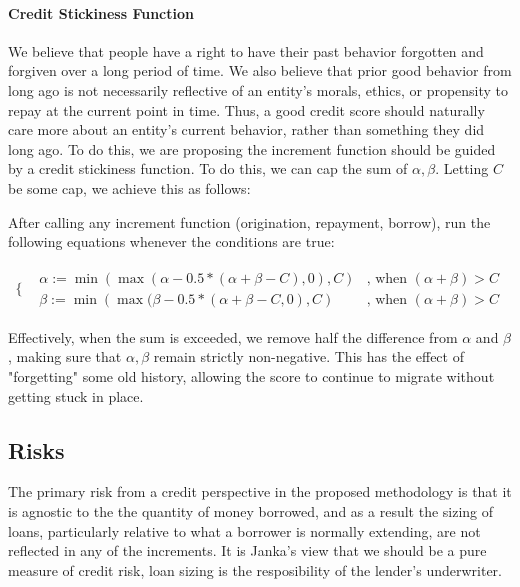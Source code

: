 \documentclass{article}
\begin{document}
\paragraph{Credit Stickiness Function}

We believe that people have a right to have their past behavior forgotten and forgiven over a long period of time. We also believe that prior good behavior from long ago is not necessarily reflective of an entity’s morals, ethics, or propensity to repay at the current point in time. Thus, a good credit score should naturally care more about an entity’s current behavior, rather than something they did long ago. To do this, we are proposing the increment function should be guided by a credit stickiness function. To do this, we can cap the sum of $\alpha,\beta$. Letting $C$ be some cap, we achieve this as follows:

After calling any increment function (origination, repayment, borrow), run the following equations whenever the conditions are true:

\begin{equation}
    \begin{array}{cc}
  \{ & 
    \begin{array}{cc}
      \alpha := \min{(\max{(\alpha - 0.5*(\alpha+\beta-C), 0)}, C)}  & \text{, when } (\alpha + \beta)> C \\
      \beta := \min{(\max{(\beta - 0.5*(\alpha+\beta-C, 0)}, C)}  & \text{, when }(\alpha + \beta)> C
    \end{array}
\end{array}
\end{equation}

Effectively, when the sum is exceeded, we remove half the difference from $\alpha$ and $\beta$, making sure that $\alpha,\beta$ remain strictly non-negative. This has the effect of "forgetting" some old history, allowing the score to continue to migrate without getting stuck in place. 

\subsection{Risks}

The primary risk from a credit perspective in the proposed methodology is that it is agnostic to the the quantity of money borrowed, and as a result the sizing of loans, particularly relative to what a borrower is normally extending, are not reflected in any of the increments. It is Janka's view that we should be a pure measure of credit risk, loan sizing is the resposibility of the lender's underwriter.
\end{document}
